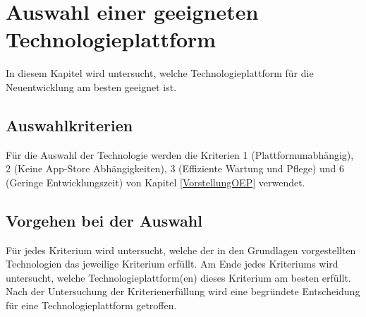 \documentclass[ngerman]{article}
\begin{document}
    \newpage\noindent
    \section{Auswahl einer geeigneten Technologieplattform}
    \label{AuswahlTechnologieplattform}
    In diesem Kapitel wird untersucht, welche Technologieplattform für die Neuentwicklung am besten geeignet ist.
    \subsection{Auswahlkriterien}
    Für die Auswahl der Technologie werden die Kriterien 1 (Plattformunabhängig), 2 (Keine App-Store Abhängigkeiten), 3 (Effiziente Wartung und Pflege) und 6 (Geringe Entwicklungszeit) von Kapitel \ref{VorstellungOEP} verwendet.
    \subsection{Vorgehen bei der Auswahl}
    Für jedes Kriterium wird untersucht, welche der in den Grundlagen vorgestellten Technologien das jeweilige Kriterium erfüllt. Am Ende jedes Kriteriums wird untersucht, welche Technologieplattform(en) dieses Kriterium am besten erfüllt.\\
    Nach der Untersuchung der Kriterienerfüllung wird eine begründete Entscheidung für eine Technologieplattform getroffen.
\end{document}
